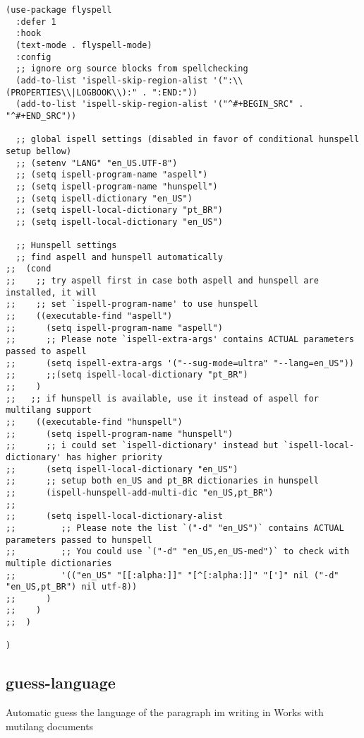 \documentclass[11pt]{article}
\begin{document}
\begin{verbatim}
(use-package flyspell
  :defer 1
  :hook
  (text-mode . flyspell-mode)
  :config
  ;; ignore org source blocks from spellchecking
  (add-to-list 'ispell-skip-region-alist '(":\\(PROPERTIES\\|LOGBOOK\\):" . ":END:"))
  (add-to-list 'ispell-skip-region-alist '("^#+BEGIN_SRC" . "^#+END_SRC"))

  ;; global ispell settings (disabled in favor of conditional hunspell setup bellow)
  ;; (setenv "LANG" "en_US.UTF-8")
  ;; (setq ispell-program-name "aspell")
  ;; (setq ispell-program-name "hunspell")
  ;; (setq ispell-dictionary "en_US")
  ;; (setq ispell-local-dictionary "pt_BR")
  ;; (setq ispell-local-dictionary "en_US")

  ;; Hunspell settings
  ;; find aspell and hunspell automatically
;;  (cond
;;    ;; try aspell first in case both aspell and hunspell are installed, it will
;;    ;; set `ispell-program-name' to use hunspell
;;    ((executable-find "aspell")
;;      (setq ispell-program-name "aspell")
;;      ;; Please note `ispell-extra-args' contains ACTUAL parameters passed to aspell
;;      (setq ispell-extra-args '("--sug-mode=ultra" "--lang=en_US"))
;;      ;;(setq ispell-local-dictionary "pt_BR")
;;    )
;;   ;; if hunspell is available, use it instead of aspell for multilang support
;;    ((executable-find "hunspell")
;;      (setq ispell-program-name "hunspell")
;;      ;; i could set `ispell-dictionary' instead but `ispell-local-dictionary' has higher priority
;;      (setq ispell-local-dictionary "en_US")
;;      ;; setup both en_US and pt_BR dictionaries in hunspell
;;      (ispell-hunspell-add-multi-dic "en_US,pt_BR")
;;
;;      (setq ispell-local-dictionary-alist
;;         ;; Please note the list `("-d" "en_US")` contains ACTUAL parameters passed to hunspell
;;         ;; You could use `("-d" "en_US,en_US-med")` to check with multiple dictionaries
;;         '(("en_US" "[[:alpha:]]" "[^[:alpha:]]" "[']" nil ("-d" "en_US,pt_BR") nil utf-8))
;;      )
;;    )
;;  )

)
\end{verbatim}

\subsection*{guess-language}
\label{sec:orgdb19ddb}

Automatic guess the language of the paragraph im writing in
Works with mutilang documents
\end{document}
